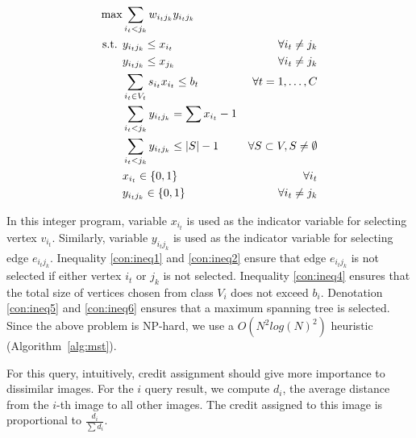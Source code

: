 {\footnotesize
\begin{align}
\max        & \notag
              \sum_{i_t< j_k} w_{i_tj_k} y_{i_tj_k} \\
\text{s.t.     } & \label{con:ineq1}
              y_{i_tj_k} \leq x_{i_t}             & \forall i_t\neq j_k \\
            & \label{con:ineq2}
              y_{i_tj_k} \leq x_{j_k}             & \forall i_t\neq j_k\\
            & \label{con:ineq4}
            \sum_{i_t\in V_t} s_{i_t}x_{i_t}\le b_t        & \forall t=1,\ldots , C \\
            & \label{con:ineq5}
            \sum_{i_t<j_k} y_{i_tj_k}=\sum x_{i_t}-1      &    \\
             & \label{con:ineq6}
            \sum_{i_t<j_k} y_{i_tj_k}\le |S|-1           & \forall S\subset V, S\neq \emptyset\\
            & \notag
            x_{i_t} \in\{0,1\}        & \forall i_t\\
            & \notag
            y_{i_tj_k} \in\{0,1\}                 & \forall i_t\neq j_k
\end{align}
}

In this integer program, variable $x_{i_t}$ is used as the indicator
variable for selecting vertex $v_{i_t}$.
%
Similarly, variable $y_{i_tj_k}$ is used as the indicator variable for
selecting edge $e_{i_tj_k}$.
%
Inequality \ref{con:ineq1} and \ref{con:ineq2} ensure that edge
$e_{i_tj_k}$ is not selected if either vertex $i_t$ or $j_k$ is not
selected.
%
Inequality \ref{con:ineq4} ensures that the total size of vertices
chosen from class $V_i$ does not exceed $b_i$.
%
Denotation \ref{con:ineq5} and \ref{con:ineq6} ensures that a maximum
spanning tree is selected.
%
Since the above problem is NP-hard, we use a $O(N^2log(N)^2)$
heuristic (Algorithm~\ref{alg:mst}).
%

For this query, intuitively, credit assignment should give more
importance to dissimilar images.
%
For the $i$ query result, we compute $d_i$, the average distance from
the $i$-th image to all other images.
%
The credit assigned to this image is proportional to
$\frac{d_i}{\sum{d_i}}$. %


